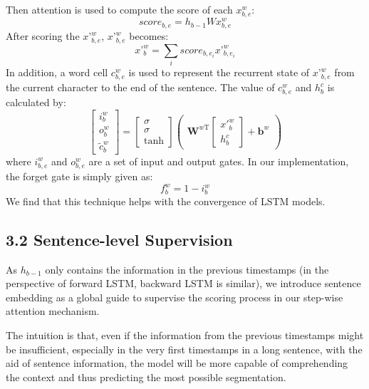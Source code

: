 \documentclass[letterpaper]{article} %
\begin{document}
Then attention is used to compute the score of each $x_{b,e}^w$:
\begin{equation}
    score_{b,e}=h_{b-1}Wx_{b,e}^w
\end{equation}
After scoring the $x’_{b,e}^w$, $x’_{b,e}^w$ becomes:
\begin{equation}
    x’_{b}^w=\sum_{i}score_{b,e_{i}}x’_{b,e_{i}}^w
\end{equation}
In addition, a word cell $c_{b,e}^w$ is used to represent the recurrent state of $x’_{b,e}^w$ from the current character to the end of the sentence. The value of $c_{b,e}^w$ and $h_b^c$ is calculated by:
\begin{equation}
\begin{bmatrix}
i_{b}^w\\
o_{b}^w\\
\tilde{c}_{b}^w
\end{bmatrix}=
\begin{bmatrix}
\sigma\\
\sigma\\
\tanh
\end{bmatrix}
\begin{pmatrix}
\textbf{W}^{w\mathrm{T}}\begin{bmatrix}
x'_{b}^w \\
h_b^c
\end{bmatrix}+\textbf{b}^w
\end{pmatrix}
\end{equation}
where $i_{b,e}^w$ and $o_{b,e}^w$ are a set of input and output gates. In our implementation, the forget gate is simply given as:
\begin{equation}
    f_{b}^w = 1 - i_{b}^w
\end{equation}
We find that this technique helps with the convergence of LSTM models.

\subsection{3.2 Sentence-level Supervision}
As $h_{b-1}$ only contains the information in the previous timestamps (in the perspective of forward LSTM, backward LSTM is similar), we introduce sentence embedding as a global guide to supervise the scoring process in our step-wise attention mechanism.

The intuition is that, even if the information from the previous timestamps might be insufficient, especially in the very first timestamps in a long sentence, with the aid of sentence information, the model will be more capable of comprehending the context and thus predicting the most possible segmentation.
\end{document}
